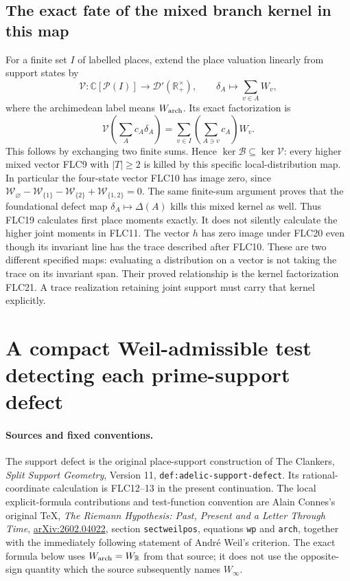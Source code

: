 \documentclass[11pt]{article}
\begin{document}
\subsection{The exact fate of the mixed branch kernel in this map}
For a finite set $I$ of labelled places, extend the place valuation
linearly from support states by
\[
\mathcal V:\mathbb C[\mathcal P(I)]\longrightarrow
 \mathcal D'(\mathbb R_+^\times),\qquad
\delta_A\longmapsto\sum_{v\in A}W_v,
\tag{FLC20}
\]
where the archimedean label means $W_{\rm arch}$.
Its exact factorization is
\[
\mathcal V\!\left(\sum_Ac_A\delta_A\right)
 =\sum_{v\in I}\left(\sum_{A\ni v}c_A\right)W_v.
\tag{FLC21}
\]
This follows by exchanging two finite sums. Hence
$\ker\mathcal B\subseteq\ker\mathcal V$: every higher mixed vector
FLC9 with $|T|\ge2$ is killed by this specific local-distribution map.
In particular the four-state vector FLC10 has image zero, since
$\mathcal W_\varnothing-\mathcal W_{\{1\}}-
\mathcal W_{\{2\}}+\mathcal W_{\{1,2\}}=0$.
The same finite-sum argument proves that the foundational defect map
$\delta_A\mapsto\Delta(A)$ kills this mixed kernel as well.
Thus FLC19 calculates first place moments exactly. It does not
silently calculate the higher joint moments in FLC11.
The vector $h$ has zero image under FLC20 even though its invariant
line has the trace described after FLC10. These are two different
specified maps: evaluating a distribution on a vector is not taking
the trace on its invariant span. Their proved relationship is the
kernel factorization FLC21. A trace realization retaining joint
support must carry that kernel explicitly.



\section{A compact Weil-admissible test detecting each prime-support defect}

\paragraph{Sources and fixed conventions.}
The support defect is the original place-support construction of
The Clankers, \emph{Split Support Geometry}, Version 11,
\texttt{def:adelic-support-defect}. Its rational-coordinate
calculation is FLC12--13 in the present continuation.
The local explicit-formula contributions and test-function
convention are Alain Connes's original TeX, \emph{The Riemann
Hypothesis: Past, Present and a Letter Through Time},
\href{https://arxiv.org/abs/2602.04022}{arXiv:2602.04022},
section \texttt{sectweilpos}, equations \texttt{wp} and
\texttt{arch}, together with the immediately following
statement of Andr\'e Weil's criterion. The exact formula
below uses $W_{\rm arch}=W_{\mathbb R}$ from that source;
it does not use the opposite-sign quantity which the source
subsequently names $W_\infty$.
\end{document}
